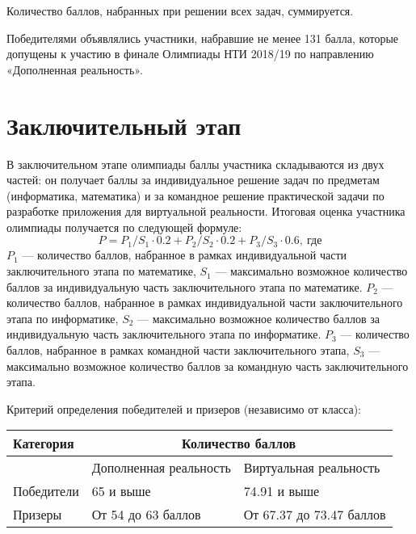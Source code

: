 Количество баллов, набранных при решении всех задач, суммируется.

Победителями объявлялись участники, набравшие не менее 131 балла, которые допущены к участию в финале Олимпиады НТИ 2018/19 по направлению «Дополненная реальность».

\section{Заключительный этап}

В заключительном этапе олимпиады баллы участника складываются из двух частей: он получает баллы за индивидуальное решение задач по предметам (информатика, математика) и за командное решение практической задачи по разработке приложения для виртуальной реальности. Итоговая оценка участника олимпиады получается по следующей формуле:
$$P = P_1/S_1 \cdot 0.2 + P_2/S_2 \cdot 0.2 + P_3/S_3 \cdot 0.6, \: \text{где}$$
$P_1$ — количество баллов, набранное в рамках индивидуальной части заключительного этапа по математике,
$S_1$ — максимально возможное количество баллов за индивидуальную часть заключительного этапа по математике.
$P_2$ — количество баллов, набранное в рамках индивидуальной части заключительного этапа по информатике,
$S_2$ — максимально возможное количество баллов за индивидуальную часть заключительного этапа по информатике.
$P_3$ — количество баллов, набранное в рамках командной части заключительного этапа,
$S_3$ — максимально возможное количество баллов за командную часть заключительного этапа.

Критерий определения победителей и призеров (независимо от класса):
\begin{center}
    \begin{tabular}{|l|l|l|}
        \hline
        Категория& \multicolumn{2}{|c|}{Количество баллов} \\
        \hline
        &Дополненная реальность& Виртуальная реальность \\
        \hline
        Победители&65 и выше& 74.91 и выше\\
        \hline
        Призеры&От 54 до 63 баллов&От 67.37 до 73.47 баллов \\
        \hline
    \end{tabular}
\end{center}

